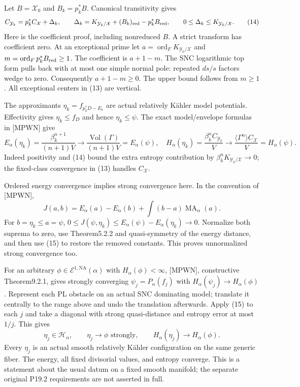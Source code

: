 \documentclass[11pt]{article}
\newcommand{\MA}{\operatorname{MA}}
\newcommand{\NA}{\mathrm{NA}}
\newcommand{\Vol}{\operatorname{Vol}}
\newcommand{\ord}{\operatorname{ord}}
\begin{document}
Let $B=\mathcal X_0$ and $B_k=p_k^*B$. Canonical transitivity gives
\[
 C_{\mathcal Y_k}=p_k^*C_{\mathcal X}+\Delta_k,\qquad
 \Delta_k=K_{\mathcal Y_k/\mathcal X}
                         +(B_k)_{\rm red}-p_k^*B_{\rm red},
 \qquad 0\leq\Delta_k\leq K_{\mathcal Y_k/\mathcal X}.    \tag{14}
\]
Here is the coefficient proof, including nonreduced $B$. A strict
transform has coefficient zero. At an exceptional prime let
$a=\ord_F K_{\mathcal Y_k/\mathcal X}$ and
$m=\ord_F p_k^*B_{\rm red}\geq1$. The coefficient is $a+1-m$.
The SNC logarithmic top form pulls back with at most one simple
normal pole: repeated $ds/s$ factors wedge to zero.
Consequently $a+1-m\geq0$. The upper bound follows from $m\geq1$.
All exceptional centers in (13) are vertical.

The approximants
$\eta_k=f_{p_k^*D-E_k}$ are actual relatively K\"ahler model
potentials. Effectivity gives $\eta_k\leq f_D$ and hence
$\eta_k\leq\psi$. The exact model/envelope formulas in [MPWN] give
\[
 E_\alpha(\eta_k)=\frac{\beta_k^{n+1}}{(n+1)V}
       \longrightarrow\frac{\Vol(\Gamma)}{(n+1)V}=E_\alpha(\psi),
 \quad
 H_\alpha(\eta_k)=\frac{\beta_k^n C_{\mathcal Y_k}}V
       \longrightarrow\frac{\langle\Gamma^n\rangle C_{\mathcal X}}V
                    =H_\alpha(\psi).                       \tag{15}
\]
Indeed positivity and (14) bound the extra entropy contribution by
$\beta_k^nK_{\mathcal Y_k/\mathcal X}\to0$; the fixed-class
convergence in (13) handles $C_{\mathcal X}$.

Ordered energy convergence implies strong convergence here. In the
convention of [MPWN],
\[
 J(a,b)=E_\alpha(a)-E_\alpha(b)
                  +\int(b-a)\MA_\alpha(a).
\]
For $b=\eta_k\leq a=\psi$,
$0\leq J(\psi,\eta_k)\leq E_\alpha(\psi)-E_\alpha(\eta_k)\to0$.
Normalize both suprema to zero, use Theorem5.2.2 and quasi-symmetry
of the energy distance, and then use (15) to restore the removed
constants. This proves unnormalized strong convergence too.

For an arbitrary $\phi\in\mathcal E^{1,\NA}(\alpha)$ with
$H_\alpha(\phi)<\infty$, [MPWN], constructive Theorem9.2.1, gives
strongly converging $\psi_j=P_\alpha(f_j)$ with
$H_\alpha(\psi_j)\to H_\alpha(\phi)$.
Represent each PL obstacle on an actual SNC dominating model;
translate it centrally to the range above and undo the translation
afterwards. Apply (15) to each $j$ and take a diagonal with strong
quasi-distance and entropy error at most $1/j$. This gives
\[
 \eta_j\in\mathcal H_\alpha,\qquad
 \eta_j\to\phi\text{ strongly},\qquad
 H_\alpha(\eta_j)\to H_\alpha(\phi).                       \tag{16}
\]
Every $\eta_j$ is an actual smooth relatively K\"ahler configuration
on the same generic fiber. The energy, all fixed divisorial values,
and entropy converge. This is a statement about the usual datum on
a fixed smooth manifold; the separate original P19.2 requirements
are not asserted in full.
\end{document}
